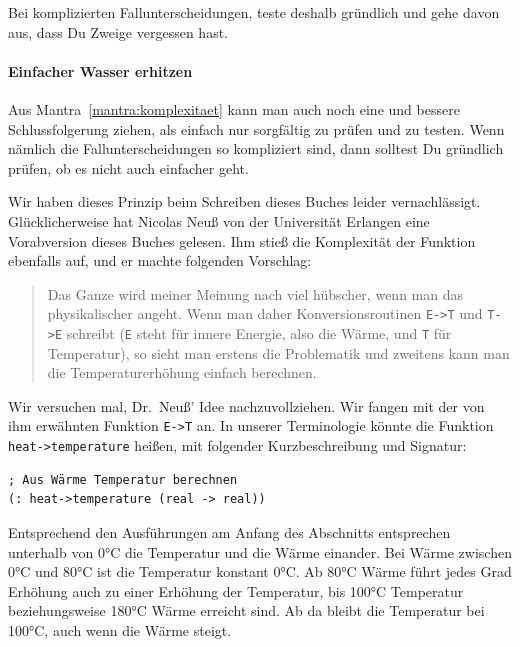 \mantrakomplexitaet*

\noindent Bei komplizierten Fallunterscheidungen, teste deshalb gründlich und
gehe davon aus, dass Du Zweige vergessen hast.

\paragraph{Einfacher Wasser erhitzen}

Aus Mantra~\ref{mantra:komplexitaet} kann man auch noch eine und
bessere Schlussfolgerung ziehen, als einfach nur sorgfältig zu prüfen
und zu testen.  Wenn nämlich die Fallunterscheidungen so kompliziert
sind, dann solltest Du gründlich prüfen, ob es nicht auch einfacher
geht.

Wir haben dieses Prinzip beim Schreiben dieses Buches leider
vernachlässigt.  Glücklicherweise hat Nicolas Neuß von der Universität
Erlangen eine Vorabversion dieses Buches gelesen.  Ihm stieß die
Komplexität der Funktion ebenfalls auf, und er machte folgenden
Vorschlag:
%
\begin{quote}
  Das Ganze wird meiner Meinung nach viel hübscher, wenn man das
  physikalischer angeht.  Wenn man daher Konversionsroutinen
  \verb|E->T| und \verb|T->E| schreibt (\texttt{E} steht für innere
  Energie, also die Wärme, und \texttt{T} für Temperatur), so sieht
  man erstens die Problematik und zweitens kann man die
  Temperaturerhöhung einfach berechnen.
\end{quote}
%
Wir versuchen mal, Dr.\ Neuß' Idee nachzuvollziehen.  Wir fangen mit
der von ihm erwähnten Funktion \verb|E->T| an.  In unserer
Terminologie könnte die Funktion \lstinline{heat->temperature} heißen,
mit folgender Kurzbeschreibung und Signatur:
%
\begin{lstlisting}
; Aus Wärme Temperatur berechnen
(: heat->temperature (real -> real))
\end{lstlisting}
%
Entsprechend den Ausführungen am Anfang des Abschnitts entsprechen
unterhalb von 0\si{\degree}C die Temperatur und die Wärme einander.  Bei Wärme
zwischen 0\si{\degree}C und 80\si{\degree}C ist die Temperatur konstant 0\si{\degree}C. Ab 80\si{\degree}C Wärme
führt jedes Grad Erhöhung auch zu einer Erhöhung der Temperatur, bis
100\si{\degree}C Temperatur beziehungsweise 180\si{\degree}C Wärme erreicht sind.  Ab da
bleibt die Temperatur bei 100\si{\degree}C, auch wenn die Wärme steigt.

